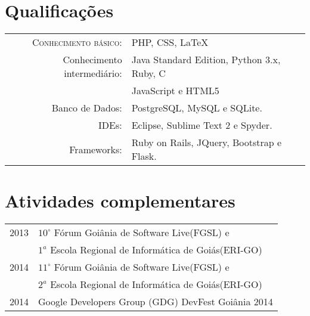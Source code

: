 \documentclass[a4paper,10pt]{article} %
\begin{document}

\section{Qualificações}

\begin{tabular}{rl}
	\textsc{Conhecimento básico:} & PHP, CSS, \LaTeX\\

	Conhecimento intermediário: & Java Standard Edition, Python 3.x, Ruby, C\\
	& JavaScript e HTML5\\

	Banco de Dados: & PostgreSQL, MySQL e SQLite. \\

	IDEs: & Eclipse, Sublime Text 2 e Spyder. \\

	Frameworks: & Ruby on Rails, JQuery, Bootstrap e Flask. \\

\end{tabular}


\section{Atividades complementares}

\begin{tabular}{rl}
	2013 & $10^{\circ}$ Fórum Goiânia de Software Live(FGSL) e \\
	& $1^{a}$ Escola Regional de Informática de Goiás(ERI-GO)\\

	2014 & $11^{\circ}$ Fórum Goiânia de Software Live(FGSL) e \\
	& $2^{a}$ Escola Regional de Informática de Goiás(ERI-GO)\\

	2014 & Google Developers Group (GDG) DevFest Goiânia 2014\\
\end{tabular}
\end{document}
